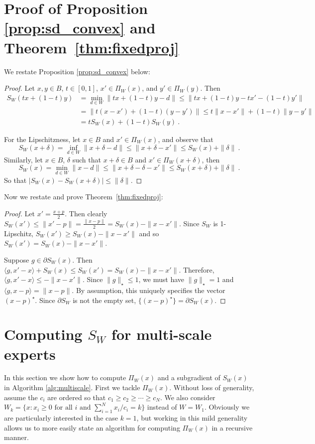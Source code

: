 \documentclass[12pt]{colt2018} %
\begin{document}
\section{Proof of Proposition \ref{prop:sd_convex} and Theorem~\ref{thm:fixedproj}}
\label{sec:sd_convex}
We restate Proposition \ref{prop:sd_convex} below:
\sdconvex*
\begin{proof}
Let $x,y\in B$, $t\in[0,1]$, $x'\in \Pi_W(x)$, and $y'\in \Pi_W(y)$.
Then
\begin{align*}
S_W(tx+(1-t)y)
&=\min_{d \in W} \|tx+(1-t)y - d\|
\le \|tx+(1-t)y - t x' - (1-t) y'\|\\
&=\|t(x-x') + (1-t)(y-y')\|
\le t\|x-x'\| + (1-t)\|y-y'\|\\
&=t S_W(x) + (1-t) S_W(y)~.
\end{align*}

For the Lipschitzness, let $x\in B$ and $x'\in \Pi_W(x)$, and observe that
\[
S_W(x+\delta)
= \inf_{d \in W} \|x+\delta - d\|
\le \|x+\delta - x'\|
\le S_W(x) +\|\delta\|~.
\]
Similarly, let $x\in B$, $\delta$ such that $x+\delta \in B$ and $x'\in \Pi_W(x+\delta)$, then
\[
S_W(x)
= \min_{d \in W}\|x - d\|
\le\|x+\delta-\delta - x'\|
\le S_W(x+\delta)+\|\delta\|~.
\]
So that $|S_W(x)-S_W(x+\delta)|\le \|\delta\|$.
\end{proof}

Now we restate and prove Theorem~\ref{thm:fixedproj}:
\fixedproj*

\begin{proof}
Let $x'=\frac{x+p}{2}$. Then clearly $S_W(x')\le \|x'-p\|=\frac{\|x-p\|}{2} = S_W(x)-\|x-x'\|$. Since $S_W$ is 1-Lipschitz, $S_W(x')\ge S_W(x)-\|x-x'\|$ and so $S_W(x')=S_W(x)-\|x-x'\|$. 

Suppose $g\in \partial S_W(x)$. Then $\langle g,x'-x\rangle +S_W(x)\le S_W(x')=S_W(x)-\|x-x'\|$. Therefore, $\langle g, x'-x\rangle \le -\|x-x'\|$. Since $\|g\|_\star \le 1$, we must have $\|g\|_\star =1$ and $\langle g,  x-p\rangle =\|x-p\|$. By assumption, this uniquely specifies the vector $(x-p)^\star$. Since $\partial S_W$ is not the empty set, $\{(x-p)^\star\} = \partial S_W(x)$.
\end{proof}

\section{Computing $S_W$ for multi-scale experts}\label{sec:simplexprojection}

In this section we show how to compute $\Pi_W(x)$ and a subgradient of $S_W(x)$ in Algorithm \ref{alg:multiscale}. First we tackle $\Pi_W(x)$. Without loss of generality, assume the $c_i$ are ordered so that $c_1\ge c_2\ge \cdots\ge c_N$. We also consider $W_k = \{x:x_i\ge 0\text{ for all }i\text{ and }\sum_{i=1}^N x_i/c_i=k\}$ instead of $W=W_1$. Obviously we are particularly interested in the case $k=1$, but working in this mild generality allows us to more easily state an algorithm for computing $\Pi_W(x)$ in a recursive manner.
\end{document}
